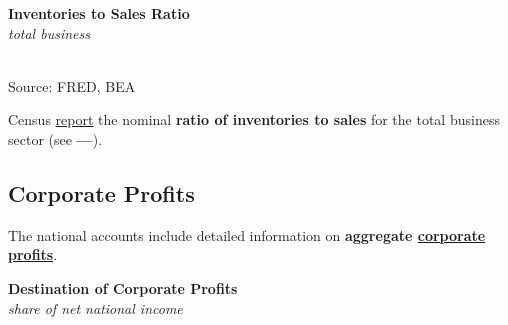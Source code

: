 \documentclass{report}
\makeatletter
\newcommand{\tbllink}[1]{\href{https://raw.githubusercontent.com/bdecon/US-chartbook/master/chartbook/data/#1}{\faTable}}
\newcommand*\short[1]{\expandafter\@gobbletwo\number\numexpr#1\relax}
\newcommand{\shdateaxisticks}{
		date coordinates in=x, axis line style={draw=none},
		xmax={2023-10-01},
		max space between ticks=40,	    
		xtick={{1990-01-01}, {1995-01-01}, {2000-01-01}, 
			{2005-01-01}, {2010-01-01}, {2015-01-01}, {2020-01-01}},
		minor xtick={},
		enlarge y limits={0.06}, enlarge x limits={0.01},
		}
\newcommand{\stdline}[4]{\addplot[very thick, no markers, color=#1] 
		table [x=#2, y=#3, col sep=comma] {#4};	}
\newcommand{\thinline}[4]{\addplot[no markers, color=#1] 
		table [x=#2, y=#3, col sep=comma] {#4};	}
\newcommand{\rbars}{
		\fill[color=black!10] (axis cs:{1990-07-01},\pgfkeysvalueof{/pgfplots/ymin}) rectangle 
			(axis cs:{1991-03-01}, \pgfkeysvalueof{/pgfplots/ymax});
		\fill[color=black!10] (axis cs:{2007-12-01},\pgfkeysvalueof{/pgfplots/ymin}) rectangle 
			(axis cs:{2009-07-01}, \pgfkeysvalueof{/pgfplots/ymax});
		\fill[color=black!10] (axis cs:{2001-03-01},\pgfkeysvalueof{/pgfplots/ymin}) rectangle 
			(axis cs:{2001-11-01}, \pgfkeysvalueof{/pgfplots/ymax});
		\fill[color=black!10] (axis cs:{2020-02-01},\pgfkeysvalueof{/pgfplots/ymin}) rectangle 
			(axis cs:{2020-05-01}, \pgfkeysvalueof{/pgfplots/ymax});}
\makeatother
\begin{document}
{\begin{minipage}{0.4\textwidth}
\normalsize \textbf{Inventories to Sales Ratio}\\
\footnotesize{\textit{total business}}\\
\hspace*{-2mm} \\
\footnotesize{Source: FRED, BEA} \hfill \tbllink{isratio.csv}
\end{minipage} \hspace{7mm}
\begin{minipage}{0.31\textwidth}
\small Census \href{https://www.census.gov/mtis/www/data/pdf/mtis_current.pdf}{report} the nominal \textbf{ratio of inventories to sales} for the total business sector (see {\color{blue!40!cyan!80!white}\textbf{---}}). 
\end{minipage}
\newpage 
\hypertarget{buspr}{\label{buspr}}
\begin{minipage}{0.76\textwidth}   
\subsection*{Corporate Profits}
\small The national accounts include detailed information on \textbf{aggregate \href{https://www.bea.gov/data/income-saving/corporate-profits}{corporate profits}}.  
\vspace{1mm}

\normalsize \textbf{Destination of Corporate Profits}\\
\footnotesize{\textit{share of net national income}}
\vspace{3.5cm}


\end{minipage}}
\end{document}
